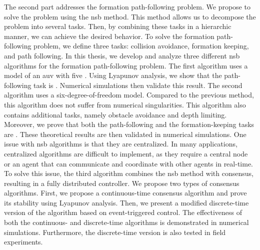 The second part addresses the formation path-following problem.
We propose to solve the problem using the \acrlong{nsb} method.
This method allows us to decompose the problem into several tasks.
Then, by combining these tasks in a hierarchic manner, we can achieve the desired behavior.
To solve the formation path-following problem, we define three tasks: collision avoidance, formation keeping, and path following.
In this thesis, we develop and analyze three different \acrlong{nsb} algorithms for the formation path-following problem.
The first algorithm uses a model of an \acrlong{auv} with five .
Using Lyapunov analysis, we show that the path-following task is .
Numerical simulations then validate this result.
The second algorithm uses a six-degree-of-freedom model.
Compared to the previous method, this algorithm does not suffer from numerical singularities.
This algorithm also contains additional tasks, namely obstacle avoidance and depth limiting.
Moreover, we prove that both the path-following and the formation-keeping tasks are .
These theoretical results are then validated in numerical simulations.
One issue with \acrlong{nsb} algorithms is that they are centralized.
In many applications, centralized algorithms are difficult to implement, as they require a central node or an agent that can communicate and coordinate with other agents in real-time.
To solve this issue, the third algorithm combines the \acrlong{nsb} method with consensus, resulting in a fully distributed controller.
We propose two types of consensus algorithms.
First, we propose a continuous-time consensus algorithm and prove its stability using Lyapunov analysis.
Then, we present a modified discrete-time version of the algorithm based on event-triggered control.
The effectiveness of both the continuous- and discrete-time algorithms is demonstrated in numerical simulations.
Furthermore, the discrete-time version is also tested in field experiments.

